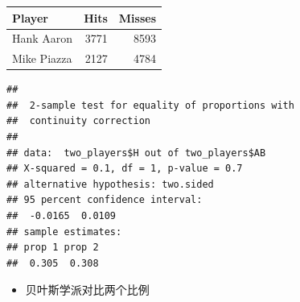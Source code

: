 \documentclass[
]{book}
\newenvironment{Shaded}{\begin{snugshade}}{\end{snugshade}}
\newcommand{\DataTypeTok}[1]{\textcolor[rgb]{0.13,0.29,0.53}{#1}}
\newcommand{\KeywordTok}[1]{\textcolor[rgb]{0.13,0.29,0.53}{\textbf{#1}}}
\newcommand{\NormalTok}[1]{#1}
\newcommand{\OperatorTok}[1]{\textcolor[rgb]{0.81,0.36,0.00}{\textbf{#1}}}
\newcommand{\StringTok}[1]{\textcolor[rgb]{0.31,0.60,0.02}{#1}}
\providecommand{\tightlist}{%
  \setlength{\itemsep}{0pt}\setlength{\parskip}{0pt}}
\begin{document}
\begin{Shaded}
\end{Shaded}

\begin{tabular}{l|r|r}
\hline
Player & Hits & Misses\\
\hline
Hank Aaron & 3771 & 8593\\
\hline
Mike Piazza & 2127 & 4784\\
\hline
\end{tabular}

\begin{Shaded}
\end{Shaded}

\begin{verbatim}
## 
## 	2-sample test for equality of proportions with
## 	continuity correction
## 
## data:  two_players$H out of two_players$AB
## X-squared = 0.1, df = 1, p-value = 0.7
## alternative hypothesis: two.sided
## 95 percent confidence interval:
##  -0.0165  0.0109
## sample estimates:
## prop 1 prop 2 
##  0.305  0.308
\end{verbatim}

\begin{itemize}
\tightlist
\item
  贝叶斯学派对比两个比例
\end{itemize}
\end{document}
